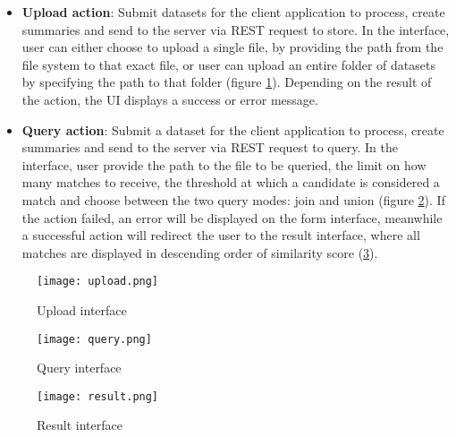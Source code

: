 \begin{itemize}
    \item \textbf{Upload action}: Submit datasets for the client application to process, create summaries and send to the server via REST request to store. In the interface, user can either choose to upload a single file, by providing the path from the file system to that exact file, or user can upload an entire folder of datasets by specifying the path to that folder (figure \ref{fig:upload}). Depending on the result of the action, the UI displays a success or error message.
    \item \textbf{Query action}: Submit a dataset for the client application to process, create summaries and send to the server via REST request to query. In the interface, user provide the path to the file to be queried, the limit on how many matches to receive, the threshold at which a candidate is considered a match and choose between the two query modes: join and union (figure \ref{fig:query}). If the action failed, an error will be displayed on the form interface, meanwhile a successful action will redirect the user to the result interface, where all matches are displayed in descending order of similarity score (\ref{fig:result}). 
\end{itemize}

\begin{figure}
    \centering
    \texttt{[image: upload.png]}
    \caption{Upload interface}
    \label{fig:upload}
\end{figure}

\begin{figure}
    \centering
    \texttt{[image: query.png]}
    \caption{Query interface}
    \label{fig:query}
\end{figure}

\begin{figure}
    \centering
    \texttt{[image: result.png]}
    \caption{Result interface}
    \label{fig:result}
\end{figure}